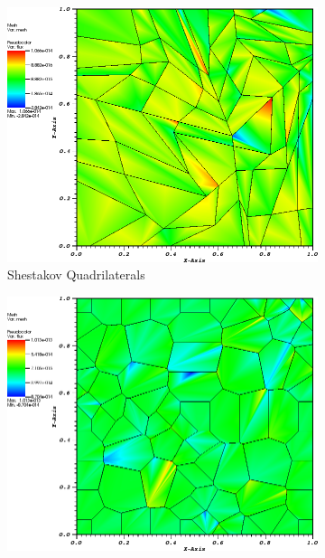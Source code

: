 \begin{figure}
{\begin{subfigure}[b]{0.465\textwidth}
	\end{subfigure}
}
\vspace{3mm}
{
	\begin{subfigure}[b]{0.465\textwidth}
		\centering
		\label{subfig::shes_quad_me_k2_lin_sol}
		\includegraphics[width=\textwidth]{figures/sec_BF/quad_err_shesquad_PWL2.png}
		\caption{Shestakov Quadrilaterals}
	\end{subfigure}
	\hfill
	\begin{subfigure}[b]{0.465\textwidth}
		\centering
		\label{subfig::smooth_poly_me_k2_lin_sol}
		\includegraphics[width=\textwidth]{figures/sec_BF/quad_err_sinepoly_PWL2.png}

\end{subfigure}}
\end{figure}
